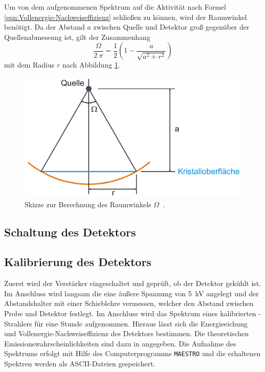 Um von dem aufgenommenen Spektrum auf die Aktivität nach Formel \eqref{eqn:Vollenergie-Nachweiseffizienz}
schließen zu können, wird der Raumwinkel benötigt.
Da der Abstand $a$ zwischen Quelle und Detektor groß gegenüber der Quellenabmessung
ist, gilt der Zusammenhang
\begin{equation}
	\frac{\Omega}{2\:\pi} = \frac{1}{2} \left(1 - \frac{a}{\sqrt{a^2 + r^2}}\right)
	\label{eqn:Raumwinkel}
\end{equation}
mit dem Radius $r$ nach Abbildung \ref{fig:Raumwinkel}.
\begin{figure}
	\centering
	\includegraphics[width=.5\textwidth]{images/Raumwinkel.pdf}
	\caption{Skizze zur Berechnung des Raumwinkels $\Omega$~\cite[25]{anleitung}.}
	\label{fig:Raumwinkel}
\end{figure}

\subsection{Schaltung des Detektors}
\label{sec:Schaltungen}


\subsection{Kalibrierung des Detektors}
\label{sec:KalibrierungBeschreibung}

Zuerst wird der Verstärker eingeschaltet und geprüft, ob der Detektor gekühlt ist.
Im Anschluss wird langsam die eine äußere Spannung von \SI{5}{\kilo\volt} angelegt
und der Abstandshalter mit einer Schieblehre vermessen,
welcher den Abstand zwischen Probe und Detektor festlegt.
Im Anschluss wird das Spektrum eines kalibrierten -Strahlers für eine Stunde aufgenommen.
Hieraus lässt sich die Energieeichung und Vollenergie-Nachweiseffizienz
des Detektors bestimmen.
Die theoretischen Emissionswahrscheinlichkeiten sind dazu in \cite[28]{anleitung} angegeben.
Die Aufnahme des Spektrums erfolgt mit Hilfe des Computerprogramms
\texttt{MAESTRO} und die erhaltenen Spektren werden als ASCII-Dateien gespeichert.

